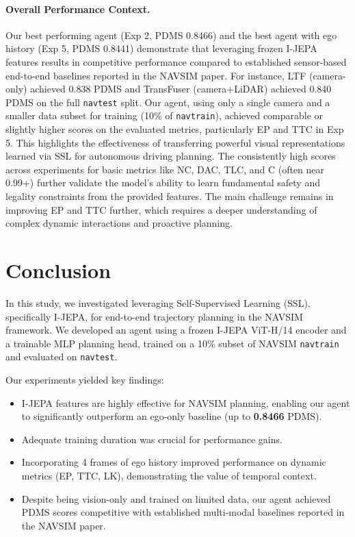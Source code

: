 \documentclass{article}
\begin{document}
\paragraph{Overall Performance Context.}
Our best performing agent (Exp 2, PDMS 0.8466) and the best agent with ego history (Exp 5, PDMS 0.8441) demonstrate that leveraging frozen I-JEPA features results in competitive performance compared to established sensor-based end-to-end baselines reported in the NAVSIM paper. For instance, LTF (camera-only) achieved 0.838 PDMS and TransFuser (camera+LiDAR) achieved 0.840 PDMS on the full \texttt{navtest} split. Our agent, using only a single camera and a smaller data subset for training (10\% of \texttt{navtrain}), achieved comparable or slightly higher scores on the evaluated metrics, particularly EP and TTC in Exp 5. This highlights the effectiveness of transferring powerful visual representations learned via SSL for autonomous driving planning. The consistently high scores across experiments for basic metrics like NC, DAC, TLC, and C (often near 0.99+) further validate the model's ability to learn fundamental safety and legality constraints from the provided features. The main challenge remains in improving EP and TTC further, which requires a deeper understanding of complex dynamic interactions and proactive planning.


\section{Conclusion}
\label{sec:conclusion}

In this study, we investigated leveraging Self-Supervised Learning (SSL), specifically I-JEPA, for end-to-end trajectory planning in the NAVSIM framework. We developed an agent using a frozen I-JEPA ViT-H/14 encoder and a trainable MLP planning head, trained on a 10\% subset of NAVSIM \texttt{navtrain} and evaluated on \texttt{navtest}.

Our experiments yielded key findings:
\begin{itemize}
    \item I-JEPA features are highly effective for NAVSIM planning, enabling our agent to significantly outperform an ego-only baseline (up to \textbf{0.8466} PDMS).
    \item Adequate training duration was crucial for performance gains.
    \item Incorporating 4 frames of ego history improved performance on dynamic metrics (EP, TTC, LK), demonstrating the value of temporal context.
    \item Despite being vision-only and trained on limited data, our agent achieved PDMS scores competitive with established multi-modal baselines reported in the NAVSIM paper.
\end{itemize}
\end{document}
